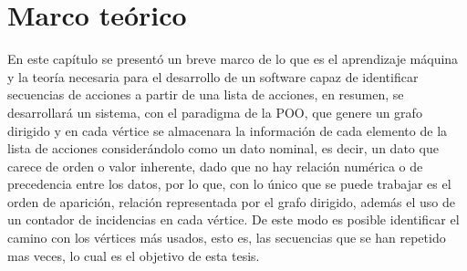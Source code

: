 
\chapter{Marco te\'orico}
\label{sec:chapter3}






\newpage
En este cap\'itulo se present\'o un breve marco de lo que es el aprendizaje
 m\'aquina y la teor\'ia necesaria para el desarrollo de un software capaz de 
 identificar secuencias de acciones a partir de una lista de acciones, en 
 resumen, se desarrollar\'a un sistema, con el paradigma de la POO, que genere 
 un grafo dirigido y en cada v\'ertice se almacenara la informaci\'on de cada 
 elemento de la lista de acciones consider\'andolo como un dato nominal, es 
 decir, un dato que carece de orden o valor inherente, dado que no hay
 relaci\'on num\'erica o de precedencia entre los datos, por lo que, con lo 
 \'unico que se puede trabajar es el orden de aparici\'on, relaci\'on 
 representada por el grafo dirigido, adem\'as el uso de un contador de 
 incidencias en cada v\'ertice. De este modo es posible identificar el camino 
 con los v\'ertices m\'as usados, esto es, las secuencias que se han repetido 
 mas veces, lo cual es el objetivo de esta tesis.
